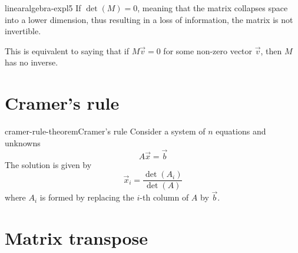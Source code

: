 \documentclass[preview]{standalone}
\begin{document}


\begin{snippet}{linearalgebra-expl5}
If \(\det(M) = 0\), meaning that the matrix collapses space into a lower dimension,
thus resulting in a loss of information, the matrix is not invertible.

This is equivalent to saying that if \(M\vec{v}=0\) for some non-zero vector \(\vec{v}\),
then \(M\) has no inverse.
\end{snippet}


\section{Cramer's rule}

\begin{snippettheorem}{cramer-rule-theorem}{Cramer's rule}
    Consider a system of \(n\) equations and unknowns
    \[
        A\vec{x}=\vec{b}
    \]
    The solution is given by
    \[
        \vec{x}_i = \frac{\det(A_i)}{\det(A)}
    \]
    where \(A_i\) is formed by replacing the \(i\)-th column
    of \(A\) by \(\vec{b}\).
\end{snippettheorem}

\section{Matrix transpose}
\end{document}
